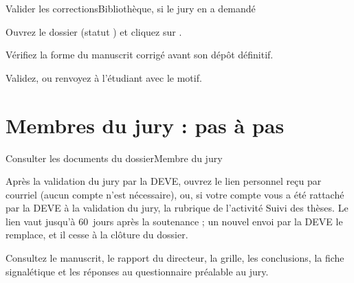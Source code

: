 \documentclass[11pt,a4paper]{article}
\begin{document}

\begin{procedure}{Valider les corrections}{Bibliothèque, si le jury en a demandé}
\begin{etapes}
  \item Ouvrez le dossier (statut ) et cliquez sur .
  \item Vérifiez la forme du manuscrit corrigé avant son dépôt définitif.
  \item Validez, ou renvoyez à l'étudiant avec le motif.
\end{etapes}
\end{procedure}


\section{Membres du jury : pas à pas}

\begin{procedure}{Consulter les documents du dossier}{Membre du jury}
\begin{etapes}
  \item Après la validation du jury par la DEVE, ouvrez le lien personnel reçu
        par courriel (aucun compte n'est nécessaire), ou, si votre compte vous
        a été rattaché par la DEVE à la validation du jury, la rubrique
         de l'activité \og Suivi des thèses\fg{}. Le lien vaut jusqu'à 60~jours après la soutenance ; un
        nouvel envoi par la DEVE le remplace, et il cesse à la clôture du
        dossier.
  \item Consultez le manuscrit, le rapport du directeur, la grille, les
        conclusions, la fiche signalétique et les réponses au questionnaire
        préalable au jury.
\end{etapes}
\end{procedure}

\end{document}
